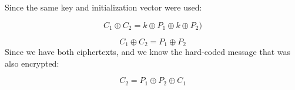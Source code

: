 \documentclass{article}
\begin{document}
Since the same key and initialization vector were used:

\begin{equation}
    C_1 \oplus C_2 = k \oplus P_1 \oplus k \oplus P_2 )
\end{equation}

\begin{equation}
    C_1 \oplus C_2 =   P_1 \oplus P_2
\end{equation}
Since we have both ciphertexts, and we know the hard-coded message that was also encrypted:

\begin{equation}
    C_2 =   P_1 \oplus P_2 \oplus C_1
\end{equation}
\end{document}
